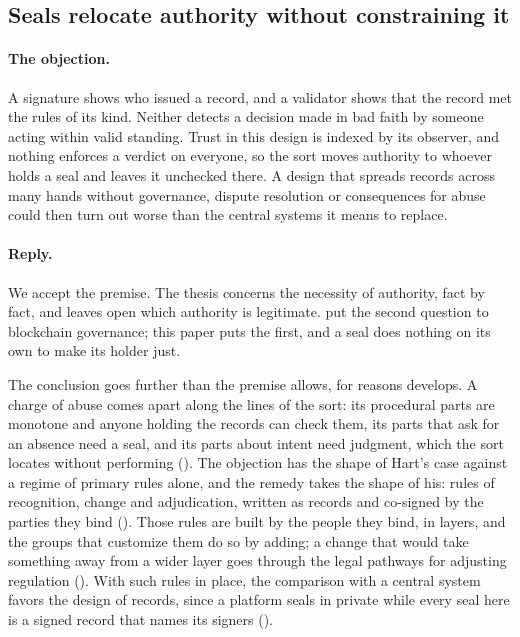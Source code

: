 \subsection{Seals relocate authority without constraining it}\label{sec:obj-relocate}

\paragraph{The objection.} A signature shows who issued a record, and a validator shows that the
record met the rules of its kind. Neither detects a decision made in bad faith by someone acting
within valid standing. Trust in this design is indexed by its observer, and nothing enforces a
verdict on everyone, so the sort moves authority to whoever holds a seal and leaves it unchecked
there. A design that spreads records across many hands without governance, dispute resolution or
consequences for abuse could then turn out worse than the central systems it means to replace.

\paragraph{Reply.} We accept the premise. The thesis concerns the necessity of authority, fact by
fact, and leaves open which authority is legitimate. \citet{reijers2016} put the second question to
blockchain governance; this paper puts the first, and a seal does nothing on its own to make its
holder just.

The conclusion goes further than the premise allows, for reasons  develops. A
charge of abuse comes apart along the lines of the sort: its procedural parts are monotone and anyone
holding the records can check them, its parts that ask for an absence need a seal, and its parts
about intent need judgment, which the sort locates without performing (). The
objection has the shape of Hart's case against a regime of primary rules alone, and the remedy takes
the shape of his: rules of recognition, change and adjudication, written as records and co-signed by
the parties they bind (). Those rules are built by the people they bind, in
layers, and the groups that customize them do so by adding; a change that would take something away
from a wider layer goes through the legal pathways for adjusting regulation ().
With such rules in place, the comparison with a central system favors the design of records, since
a platform seals in private while every seal here is a signed record that names its signers
().

